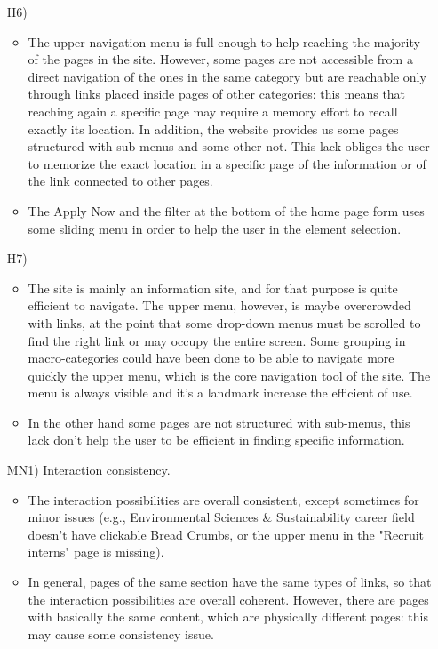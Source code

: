 \documentclass[11pt, letterpaper]{article}
\begin{document}
\begin{enumerate}
\begin{itemize}
            \end{itemize}
        \item[H6)]
            \begin{itemize}
                \item The upper navigation menu is full enough to help reaching the majority of the pages in the site. However, some pages are not accessible from a direct navigation of the ones in the same category but are reachable only through links placed inside pages of other categories: this means that reaching again a specific page may require a memory effort to recall exactly its location. In addition, the website provides us some pages structured with sub-menus and some other not. This lack obliges the user to memorize the exact location in a specific page of the information or of the link connected to other pages. 
                \item The Apply Now and the filter at the bottom of the home page form uses some sliding menu in order to help the user in the element selection. 
            \end{itemize}
        \item[H7)]
            \begin{itemize}
                \item The site is mainly an information site, and for that purpose is quite efficient to navigate. The upper menu, however, is maybe overcrowded with links, at the point that some drop-down menus must be scrolled to find the right link or may occupy the entire screen. Some grouping in macro-categories could have been done to be able to navigate more quickly the upper menu, which is the core navigation tool of the site. The menu is always visible and it’s a landmark increase the efficient of use.  
                \item In the other hand some pages are not structured with sub-menus, this lack don’t help the user to be efficient in finding specific information. 
            \end{itemize}
        \item[MN1)] Interaction consistency.
            \begin{itemize}
                \item The interaction possibilities are overall consistent, except sometimes for minor issues (e.g., Environmental Sciences \& Sustainability career field doesn't have clickable Bread Crumbs, or the upper menu in the "Recruit interns" page is missing). 
                \item In general, pages of the same section have the same types of links, so that the interaction possibilities are overall coherent. However, there are pages with basically the same content, which are physically different pages: this may cause some consistency issue. 

\end{itemize}
\end{enumerate}
\end{document}
